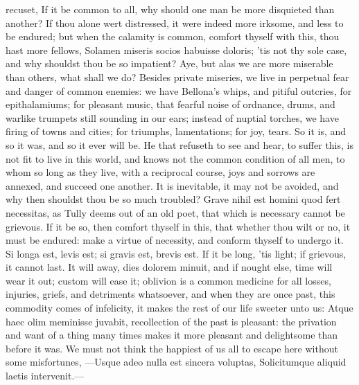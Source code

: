 {recuset, If it be common to all, why should one man be more
disquieted than another? If thou alone wert distressed, it were indeed
more irksome, and less to be endured; but when the calamity is common,
comfort thyself with this, thou hast more fellows, Solamen miseris
socios habuisse doloris; 'tis not thy sole case, and why shouldst thou
be so impatient? Aye, but alas we are more miserable than others,
what shall we do? Besides private miseries, we live in perpetual fear
and danger of common enemies: we have Bellona's whips, and pitiful
outcries, for epithalamiums; for pleasant music, that fearful noise of
ordnance, drums, and warlike trumpets still sounding in our ears;
instead of nuptial torches, we have firing of towns and cities; for
triumphs, lamentations; for joy, tears. So it is, and so it was,
and so it ever will be. He that refuseth to see and hear, to suffer
this, is not fit to live in this world, and knows not the common
condition of all men, to whom so long as they live, with a reciprocal
course, joys and sorrows are annexed, and succeed one another. It is
inevitable, it may not be avoided, and why then shouldst thou be so
much troubled? Grave nihil est homini quod fert necessitas, as
Tully deems out of an old poet, that which is necessary cannot be
grievous. If it be so, then comfort thyself in this, that whether
thou wilt or no, it must be endured: make a virtue of necessity, and
conform thyself to undergo it. Si longa est, levis est; si gravis
est, brevis est. If it be long, 'tis light; if grievous, it cannot
last. It will away, dies dolorem minuit, and if nought else, time will
wear it out; custom will ease it;  oblivion is a common medicine
for all losses, injuries, griefs, and detriments whatsoever, and
when they are once past, this commodity comes of infelicity, it makes
the rest of our life sweeter unto us:  Atque haec olim meminisse
juvabit, recollection of the past is pleasant: the privation and want
of a thing many times makes it more pleasant and delightsome than
before it was. We must not think the happiest of us all to escape here
without some misfortunes,
---Usque adeo nulla est sincera voluptas,
Solicitumque aliquid laetis intervenit.---

}
